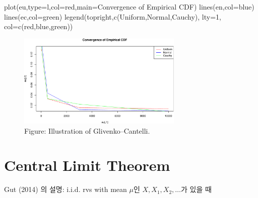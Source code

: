 \documentclass[
  13pt,
  letterpaper,
  DIV=11,
  numbers=noendperiod]{scrreprt}
\newenvironment{Shaded}{\begin{snugshade}}{\end{snugshade}}
\newcommand{\AttributeTok}[1]{\textcolor[rgb]{0.40,0.45,0.13}{#1}}
\newcommand{\DecValTok}[1]{\textcolor[rgb]{0.68,0.00,0.00}{#1}}
\newcommand{\FunctionTok}[1]{\textcolor[rgb]{0.28,0.35,0.67}{#1}}
\newcommand{\NormalTok}[1]{\textcolor[rgb]{0.00,0.23,0.31}{#1}}
\newcommand{\StringTok}[1]{\textcolor[rgb]{0.13,0.47,0.30}{#1}}
\theoremstyle{definition}
\theoremstyle{plain}
\theoremstyle{definition}
\theoremstyle{plain}
\theoremstyle{plain}
\theoremstyle{definition}
\theoremstyle{remark}
\begin{document}
\begin{Shaded}
\begin{Highlighting}[]
\FunctionTok{plot}\NormalTok{(eu,}\AttributeTok{type=}\StringTok{\textquotesingle{}l\textquotesingle{}}\NormalTok{,}\AttributeTok{col=}\StringTok{\textquotesingle{}red\textquotesingle{}}\NormalTok{,}\AttributeTok{main=}\StringTok{\textquotesingle{}Convergence of Empirical CDF\textquotesingle{}}\NormalTok{)}
\FunctionTok{lines}\NormalTok{(en,}\AttributeTok{col=}\StringTok{\textquotesingle{}blue\textquotesingle{}}\NormalTok{)}
\FunctionTok{lines}\NormalTok{(ec,}\AttributeTok{col=}\StringTok{\textquotesingle{}green\textquotesingle{}}\NormalTok{)}
\FunctionTok{legend}\NormalTok{(}\StringTok{\textquotesingle{}topright\textquotesingle{}}\NormalTok{,}\FunctionTok{c}\NormalTok{(}\StringTok{\textquotesingle{}Uniform\textquotesingle{}}\NormalTok{,}\StringTok{\textquotesingle{}Normal\textquotesingle{}}\NormalTok{,}\StringTok{\textquotesingle{}Cauchy\textquotesingle{}}\NormalTok{), }\AttributeTok{lty=}\DecValTok{1}\NormalTok{, }\AttributeTok{col=}\FunctionTok{c}\NormalTok{(}\StringTok{\textquotesingle{}red\textquotesingle{}}\NormalTok{,}\StringTok{\textquotesingle{}blue\textquotesingle{}}\NormalTok{,}\StringTok{\textquotesingle{}green\textquotesingle{}}\NormalTok{))}
\end{Highlighting}
\end{Shaded}

\begin{figure}[th]

{\centering \includegraphics[width=0.7\textwidth,height=\textheight]{lln_files/figure-pdf/unnamed-chunk-1-1.pdf}

}

\caption{Figure: Illustration of Glivenko--Cantelli.}

\end{figure}%

\chapter{Central Limit Theorem}\label{sec-clt}

Gut (2014) 의 설명: i.i.d. rvs with mean \(\mu\)인
\(X, X_1, X_2,\ldots\)가 있을 때
\end{document}
